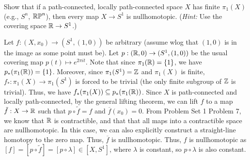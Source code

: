 \documentclass[12pt]{article}
\begin{document}
\begin{problem}{4}
    Show that if a path-connected, locally path-connected space $X$ has finite $\pi_1(X)$ (e.g., $S^n$, $\mathbb{RP}^n$), then every map $X \to S^1$ is nullhomotopic. (\emph{Hint:} Use the covering space $\mathbb{R} \to S^1$.) 
\end{problem}
\begin{solution}
    Let $f: (X, x_0) \to (S^1, (1,0))$ be arbitrary (assume wlog that $(1,0)$ is in the image as some point must be). Let $p:(\mathbb R, 0) \to (S^1, (1,0))$ be the usual covering map $p(t) \mapsto e^{2\pi i t}$. Note that since $\pi_1(\mathbb R) = \{1\}$, we have $p_*(\pi_1(\mathbb R)) = \{1\}$. Moreover, since $\pi_1(S^1) = \mathbb Z$ and $\pi_1(X)$ is finite, $f_*: \pi_1(X) \to \pi_1(S^1)$ is forced to be trivial (the only finite subgroup of $\mathbb Z$ is trivial). Thus, we have $f_*(\pi_1(X)) \subseteq p_*(\pi_1(\mathbb R))$. Since $X$ is path-connected and locally path-connected, by the general lifting theorem, we can lift $f$ to a map $\tilde{f}: X \to \mathbb R$ such that $p \circ \tilde{f} = f$ and $\overline{f}(x_0) = 0$. From Problem Set 1 Problem 7, we know that $\mathbb R$ is contractible, and that that all maps into a contractible space are nullhomotopic. In this case, we can also explicitly construct a straight-line homotopy to the zero map. Thus, $\overline{f}$ is nullhomotopic. Thus, $f$ is nullhomotopic as $[f] = [p \circ \tilde{f}] = [p \circ \lambda] \in [X, S^1]$, where $\lambda$ is constant, so $p \circ \lambda$ is also constant.
\end{solution}
\newpage 
\end{document}

